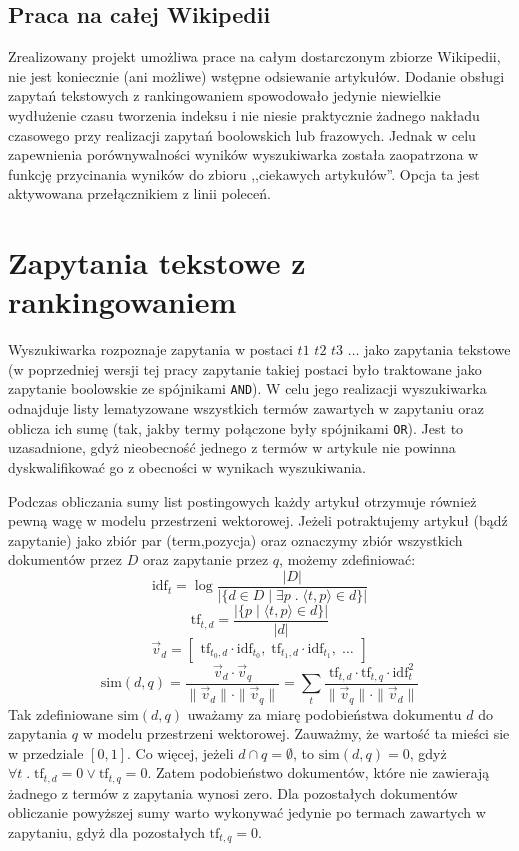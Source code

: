 \documentclass[a4paper,12pt]{article}
\begin{document}
\subsection{Praca na całej Wikipedii}
Zrealizowany projekt umożliwa prace na całym dostarczonym zbiorze Wikipedii,
nie jest koniecznie (ani możliwe) wstępne odsiewanie artykułów. Dodanie obsługi
zapytań tekstowych z rankingowaniem spowodowało jedynie niewielkie wydłużenie
czasu tworzenia indeksu i nie niesie praktycznie żadnego nakładu czasowego przy
realizacji zapytań boolowskich lub frazowych. Jednak w celu zapewnienia
porównywalności wyników wyszukiwarka została zaopatrzona w funkcję przycinania
wyników do zbioru ,,ciekawych artykułów''. Opcja ta jest aktywowana
przełącznikiem z linii poleceń.

\section{Zapytania tekstowe z rankingowaniem}
Wyszukiwarka rozpoznaje zapytania w postaci $t1$ $t2$ $t3$ $\dots$ jako
zapytania tekstowe (w poprzedniej wersji tej pracy zapytanie takiej postaci było
traktowane jako zapytanie boolowskie ze spójnikami \texttt{AND}). W celu jego
realizacji wyszukiwarka odnajduje listy lematyzowane wszystkich termów zawartych
w zapytaniu oraz oblicza ich sumę (tak, jakby termy połączone były spójnikami
\texttt{OR}). Jest to uzasadnione, gdyż nieobecność jednego z termów w artykule
nie powinna dyskwalifikować go z obecności w wynikach wyszukiwania.

Podczas obliczania sumy list postingowych każdy artykuł otrzymuje również
pewną wagę w modelu przestrzeni wektorowej. Jeżeli potraktujemy artykuł (bądź
zapytanie) jako zbiór par (term,pozycja) oraz oznaczymy zbiór wszystkich
dokumentów przez $D$ oraz zapytanie przez $q$, możemy zdefiniować:
\newcommand{\simi}[2]{\mathrm{sim}(#1,#2)}
\newcommand{\idf}[1]{\mathrm{idf}_{#1}}
\newcommand{\tf}[2]{\mathrm{tf}_{#1,#2}}
\[ \idf{t} = \log \frac{ |D| }{ |\{d \in D \mid \exists p \;.\; \langle t,p \rangle \in d\}| } \]
\[ \tf{t}{d} = \frac{ |\{ p \mid \langle t,p \rangle \in d\}| }{ |d| } \]
\[ \vec v_d = \begin{bmatrix} \tf{t_0}{d} \cdot \idf{t_0},\;
                \tf{t_1}{d} \cdot \idf{t_1},\;
                \dots \end{bmatrix} \]
\[ \simi{d}{q} =
      \frac{ \vec v_d \cdot \vec v_q }{ \|\vec v_d\| \cdot \|\vec v_q\| } =
      \sum_t \frac{ \tf{t}{d} \cdot \tf{t}{q} \cdot \idf{t}^2 }{ \|\vec v_q\| \cdot \|\vec v_d\| } \]
Tak zdefiniowane $\simi{d}{q}$ uważamy za miarę podobieństwa dokumentu $d$
do zapytania $q$ w modelu przestrzeni wektorowej. Zauważmy, że wartość ta mieści
sie w przedziale $[0, 1]$. Co więcej, jeżeli $d \cap q = \emptyset$, to
$\simi{d}{q} = 0$, gdyż $\forall t \;.\; \tf{t}{d} = 0 \vee \tf{t}{q} = 0$.
Zatem podobieństwo dokumentów, które nie zawierają żadnego z termów z zapytania
wynosi zero. Dla pozostałych dokumentów obliczanie powyższej sumy warto wykonywać
jedynie po termach zawartych w zapytaniu, gdyż dla pozostałych $\tf{t}{q} = 0$.
\end{document}
